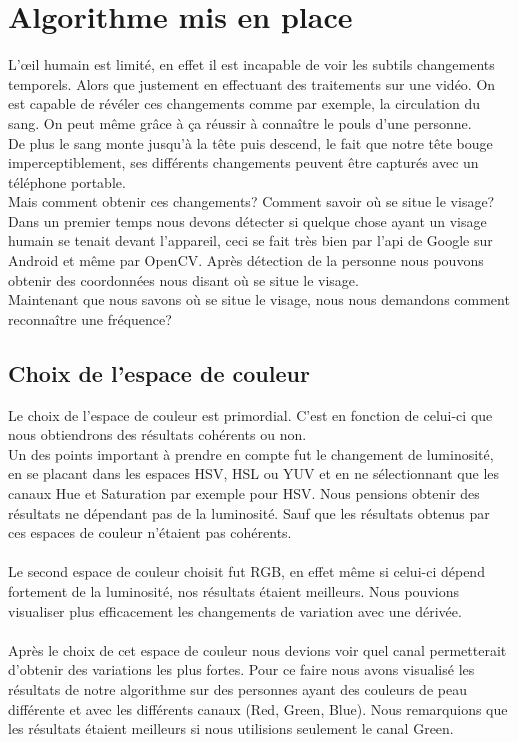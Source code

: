 \section{Algorithme mis en place}

L’\oe il humain est limité, en effet il est incapable de voir les subtils changements temporels. Alors
que justement en effectuant des traitements sur une vidéo. On est capable de révéler ces changements
comme par exemple, la circulation du sang. On peut même grâce à ça réussir à connaître le pouls d'une
personne.
\\
De plus le sang monte jusqu'à la tête puis descend, le fait que notre tête bouge imperceptiblement, ses différents changements peuvent être capturés avec un téléphone portable.
\\
Mais comment obtenir ces changements? Comment savoir où se situe le visage?\\

 Dans un premier temps nous devons détecter si quelque chose ayant un visage humain se tenait devant l'appareil, ceci se fait très bien par l'api de Google sur Android et même par OpenCV\@.
 Après détection de la personne nous pouvons obtenir des coordonnées nous disant où se situe le visage.\\
 Maintenant que nous savons où se situe le visage, nous nous demandons comment reconnaître une fréquence?\\

 \subsection{Choix de l'espace de couleur}
 Le choix de l'espace de couleur est primordial. C'est en fonction de celui-ci que nous obtiendrons des résultats cohérents ou non.\\
 Un des points important à prendre en compte fut le changement de luminosité, en se placant dans les espaces HSV, HSL ou YUV et en ne sélectionnant que les canaux Hue et Saturation par exemple pour HSV. Nous
  pensions obtenir des résultats ne dépendant pas de la luminosité. Sauf que les résultats obtenus par ces espaces de couleur n'étaient pas cohérents.\\
 \\
 Le second espace de couleur choisit fut RGB, en effet même si celui-ci dépend fortement de la luminosité, nos résultats étaient meilleurs. Nous pouvions visualiser plus efficacement les changements de
 variation avec une dérivée.\\
 \\
 Après le choix de cet espace de couleur nous devions voir quel canal permetterait d'obtenir des variations les plus fortes. Pour ce faire nous avons visualisé les résultats de notre algorithme sur des personnes ayant des couleurs de peau différente et avec les différents canaux (Red, Green, Blue). Nous remarquions que les résultats étaient meilleurs si nous utilisions seulement le canal Green.


